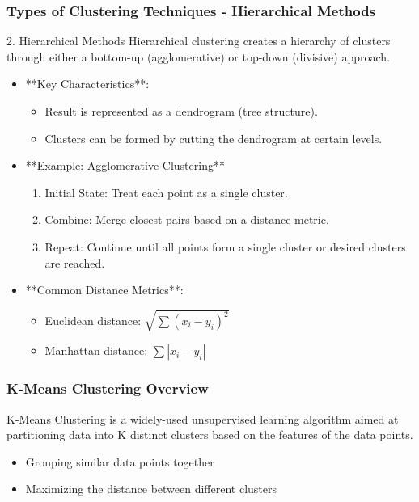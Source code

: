 \documentclass{beamer}
\begin{document}
\begin{frame}[fragile]
    \frametitle{Types of Clustering Techniques - Hierarchical Methods}
    \begin{block}{2. Hierarchical Methods}
        Hierarchical clustering creates a hierarchy of clusters through either a bottom-up (agglomerative) or top-down (divisive) approach.
    \end{block}

    \begin{itemize}
        \item **Key Characteristics**:
        \begin{itemize}
            \item Result is represented as a dendrogram (tree structure).
            \item Clusters can be formed by cutting the dendrogram at certain levels.
        \end{itemize}
        
        \item **Example: Agglomerative Clustering**
        \begin{enumerate}
            \item Initial State: Treat each point as a single cluster.
            \item Combine: Merge closest pairs based on a distance metric.
            \item Repeat: Continue until all points form a single cluster or desired clusters are reached.
        \end{enumerate}
        
        \item **Common Distance Metrics**:
        \begin{itemize}
            \item Euclidean distance: \(\sqrt{\sum{(x_i - y_i)^2}}\)
            \item Manhattan distance: \(\sum{|x_i - y_i|}\)
        \end{itemize}
    \end{itemize}
\end{frame}

\begin{frame}[fragile]
    \frametitle{K-Means Clustering Overview}
    K-Means Clustering is a widely-used unsupervised learning algorithm aimed at partitioning data into K distinct clusters based on the features of the data points. 
    \begin{itemize}
        \item Grouping similar data points together
        \item Maximizing the distance between different clusters
    \end{itemize}
\end{frame}
\end{document}
